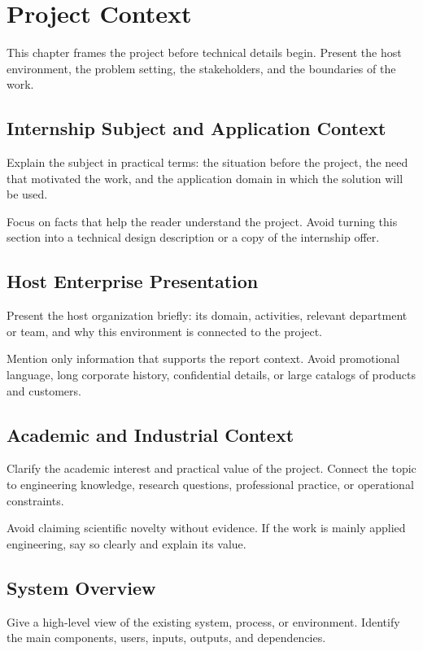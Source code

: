 \chapter{Project Context}
\label{chap:project-context}

This chapter frames the project before technical details begin. Present the host environment, the problem setting, the stakeholders, and the boundaries of the work.


\section{Internship Subject and Application Context}
Explain the subject in practical terms: the situation before the project, the need that motivated the work, and the application domain in which the solution will be used.

Focus on facts that help the reader understand the project. Avoid turning this section into a technical design description or a copy of the internship offer.

\section{Host Enterprise Presentation}
Present the host organization briefly: its domain, activities, relevant department or team, and why this environment is connected to the project.

Mention only information that supports the report context. Avoid promotional language, long corporate history, confidential details, or large catalogs of products and customers.

\section{Academic and Industrial Context}
Clarify the academic interest and practical value of the project. Connect the topic to engineering knowledge, research questions, professional practice, or operational constraints.

Avoid claiming scientific novelty without evidence. If the work is mainly applied engineering, say so clearly and explain its value.

\section{System Overview}
Give a high-level view of the existing system, process, or environment. Identify the main components, users, inputs, outputs, and dependencies.

